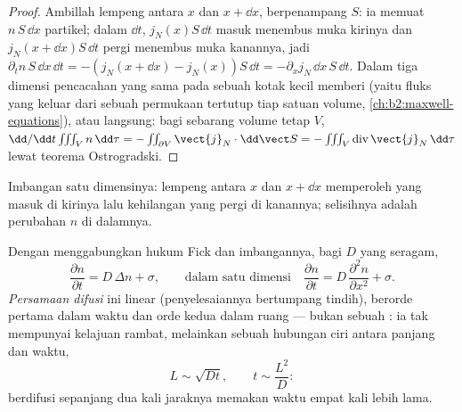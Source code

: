 \begin{proof}
Ambillah lempeng antara $x$ dan $x + \dd x$, berpenampang $S$: ia memuat
$n\,S\,\dd x$ partikel; dalam $\dd t$, $j_N(x)S\,\dd t$ masuk menembus muka
kirinya dan $j_N(x + \dd x)S\,\dd t$ pergi menembus muka kanannya, jadi
$\partial_t n\,S\,\dd x\,\dd t = -(j_N(x+\dd x) - j_N(x))S\,\dd t =
-\partial_x j_N\,\dd x\,S\,\dd t$. Dalam tiga dimensi pencacahan yang sama pada
sebuah kotak kecil memberi  (yaitu fluks yang keluar dari sebuah permukaan tertutup tiap
satuan volume, \cref{ch:b2:maxwell-equations}), atau langsung: bagi sebarang
volume tetap $V$, $\dd/\dd t \iiint_V n\,\dd\tau = -\iint_{\partial V}
\vect{j}_N\cdot\dd\vect S = -\iiint_V \operatorname{div}\vect{j}_N\,\dd\tau$
lewat teorema Ostrogradski.
\end{proof}

\begin{omfigure}

{\small Imbangan satu dimensinya: lempeng antara $x$ dan $x + \dd
x$ memperoleh yang masuk di kirinya lalu kehilangan yang pergi di kanannya;
selisihnya adalah perubahan $n$ di dalamnya.}
\end{omfigure}

\begin{theorem}\label{thm:b2:particle-diffusion:equation}
Dengan menggabungkan hukum Fick dan imbangannya, bagi $D$ yang seragam,
\[
\frac{\partial n}{\partial t} = D\,\Delta n + \sigma ,
\qquad\text{dalam satu dimensi}\quad
\frac{\partial n}{\partial t} = D\,\frac{\partial^2 n}{\partial x^2} + \sigma .
\]
\emph{Persamaan difusi} ini linear
(penyelesaiannya bertumpang tindih), berorde pertama dalam waktu dan orde kedua dalam ruang
--- bukan sebuah : ia tak mempunyai kelajuan rambat, melainkan sebuah
hubungan ciri antara panjang dan waktu,
\[
L \sim \sqrt{D t}, \qquad t \sim \frac{L^2}{D} :
\]
berdifusi sepanjang dua kali jaraknya memakan waktu empat kali lebih lama.
\end{theorem}

